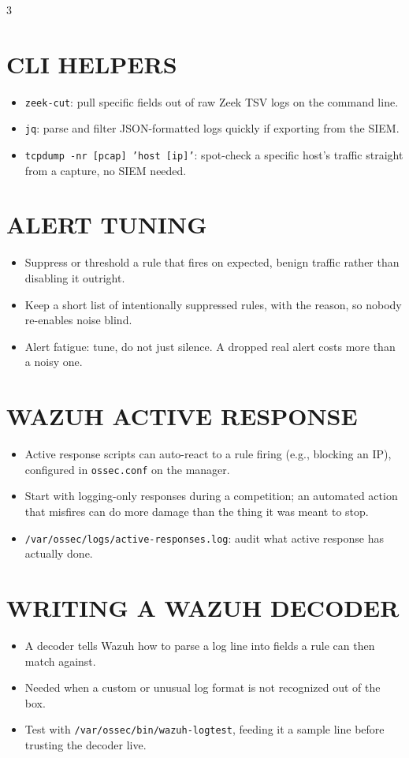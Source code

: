 \documentclass[7pt,landscape]{article}
\begin{document}
\begin{multicols*}{3}
\section{CLI HELPERS}
\begin{itemize}
    \item \texttt{zeek-cut}: pull specific fields out of raw Zeek TSV logs on the command line.
    \item \texttt{jq}: parse and filter JSON-formatted logs quickly if exporting from the SIEM.
    \item \texttt{tcpdump -nr [pcap] 'host [ip]'}: spot-check a specific host's traffic straight from a capture, no SIEM needed.
\end{itemize}

\section{ALERT TUNING}
\begin{itemize}
    \item Suppress or threshold a rule that fires on expected, benign traffic rather than disabling it outright.
    \item Keep a short list of intentionally suppressed rules, with the reason, so nobody re-enables noise blind.
    \item Alert fatigue: tune, do not just silence. A dropped real alert costs more than a noisy one.
\end{itemize}

\section{WAZUH ACTIVE RESPONSE}
\begin{itemize}
    \item Active response scripts can auto-react to a rule firing (e.g., blocking an IP), configured in \texttt{ossec.conf} on the manager.
    \item Start with logging-only responses during a competition; an automated action that misfires can do more damage than the thing it was meant to stop.
    \item \texttt{/var/ossec/logs/active-responses.log}: audit what active response has actually done.
\end{itemize}

\section{WRITING A WAZUH DECODER}
\begin{itemize}
    \item A decoder tells Wazuh how to parse a log line into fields a rule can then match against.
    \item Needed when a custom or unusual log format is not recognized out of the box.
    \item Test with \texttt{/var/ossec/bin/wazuh-logtest}, feeding it a sample line before trusting the decoder live.
\end{itemize}


\end{multicols*}
\end{document}
